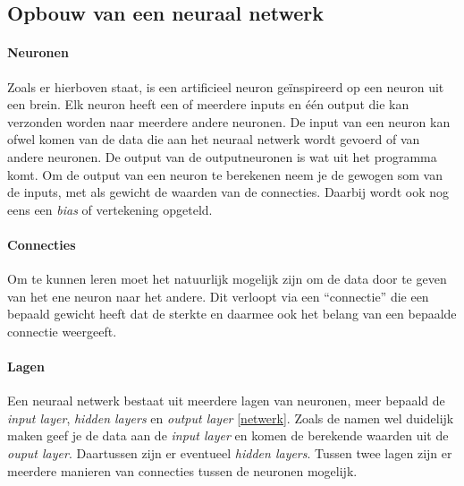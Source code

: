 \documentclass[a4paper,twoside,kulak]{kulakreport}
\begin{document}
\subsection{Opbouw van een neuraal netwerk}
\paragraph{Neuronen}
Zoals er hierboven staat, is een artificieel neuron geïnspireerd op een neuron uit een brein. Elk neuron heeft een of meerdere inputs en één output die kan verzonden worden naar meerdere andere neuronen. De input van een neuron kan ofwel komen van de data die aan het neuraal netwerk wordt gevoerd of van andere neuronen. De output van de outputneuronen is wat uit het programma komt. Om de output van een neuron te berekenen neem je de gewogen som van de inputs, met als gewicht de waarden van de connecties. Daarbij wordt ook nog eens een \emph{bias} of vertekening opgeteld.

\paragraph{Connecties}
Om te kunnen leren moet het natuurlijk mogelijk zijn om de data door te geven van het ene neuron naar het andere. Dit verloopt via een “connectie” die een bepaald gewicht heeft dat de sterkte en daarmee ook het belang van een bepaalde connectie weergeeft.

\paragraph{Lagen}
Een neuraal netwerk bestaat uit meerdere lagen van neuronen, meer bepaald de \emph{input layer}, \emph{hidden layers} en \emph{output layer} \ref{netwerk}. Zoals de namen wel duidelijk maken geef je de data aan de \emph{input layer} en komen de berekende waarden uit de \emph{ouput layer}. Daartussen zijn er eventueel \emph{hidden layers}. Tussen twee lagen zijn er meerdere manieren van connecties tussen de neuronen mogelijk.
\end{document}
